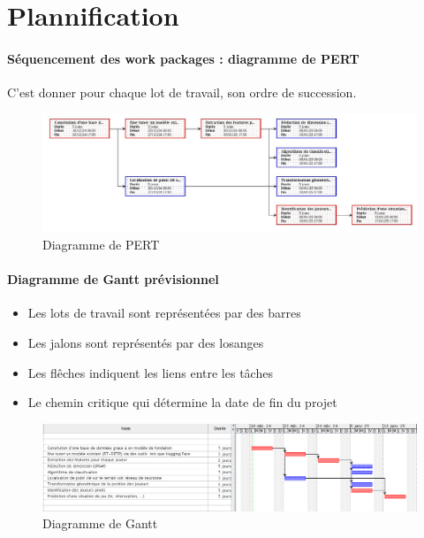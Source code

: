 \section{Plannification}
\paragraph*{Séquencement des work packages : diagramme de PERT}
C'est donner pour chaque lot de travail, son ordre de succession.
\begin{figure}
	\begin{center}
		\includegraphics[scale=0.55]{images/TactIAque_pert.jpg}
		\caption{Diagramme de PERT}
	\end{center}
\end{figure}
\paragraph*{Diagramme de Gantt prévisionnel}
\begin{itemize}
	\item Les lots de travail sont représentées par des barres
	\item Les jalons sont représentés par des losanges
	\item Les flêches indiquent les liens entre les tâches
	\item Le chemin critique qui détermine la date de fin du projet
\end{itemize}
\begin{figure}
	\begin{center}
		\includegraphics[scale=0.6]{images/tactIAque_gantt.png}
		\caption{Diagramme de Gantt}
    \end{center}
	\end{figure}